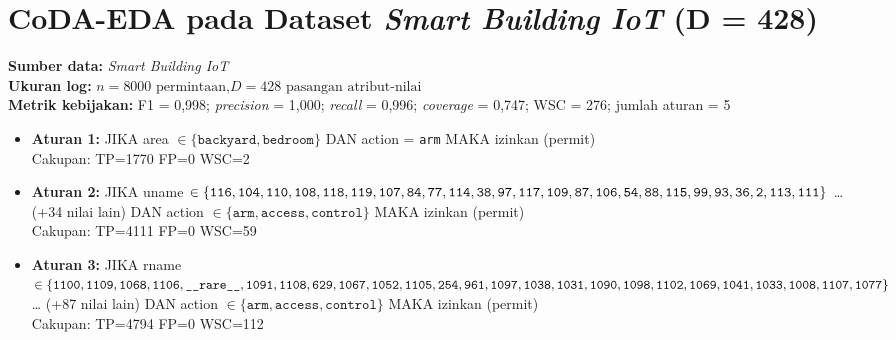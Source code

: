 \section{CoDA-EDA pada Dataset \textit{Smart Building IoT} (D = 428)}

\textbf{Sumber data:} \textit{Smart Building IoT} \\
\textbf{Ukuran log:} $n = 8000 \text{ permintaan,} D = 428 \text{ pasangan atribut-nilai}$ \\
\textbf{Metrik kebijakan:} F1 = 0,998; \textit{precision} = 1,000; \textit{recall} = 0,996; \textit{coverage} = 0,747; WSC = 276; jumlah aturan = 5 \\

\begin{itemize}
    \item \textbf{Aturan 1:} JIKA \textsf{area} $\in \{\texttt{backyard}, \texttt{bedroom}\}$ DAN \textsf{action} = \texttt{arm} MAKA izinkan (permit) \\
    \hspace*{1cm} Cakupan: TP=1770  FP=0  WSC=2

    \item \textbf{Aturan 2:} JIKA \textsf{uname} $\in \{\texttt{116}, \texttt{104}, \texttt{110}, \texttt{108}, \texttt{118}, \texttt{119}, \texttt{107}, \texttt{84}, \texttt{77}, \\\texttt{114}, \texttt{38}, \texttt{97}, \texttt{117}, \texttt{109}, \texttt{87}, \texttt{106}, \texttt{54}, \texttt{88}, \texttt{115}, \texttt{99}, \texttt{93}, \texttt{36}, \texttt{2}, \texttt{113}, \texttt{111}\}$ … (+34 nilai lain) DAN \textsf{action} $\in \{\texttt{arm}, \texttt{access}, \texttt{control}\}$ MAKA izinkan (permit) \\
    \hspace*{1cm} Cakupan: TP=4111  FP=0  WSC=59

    \item \textbf{Aturan 3:} JIKA \textsf{rname} $\in \{\texttt{1100}, \texttt{1109}, \texttt{1068}, \texttt{1106}, \texttt{\_\_rare\_\_}, \texttt{1091}, \\\texttt{1108}, \texttt{629}, \texttt{1067}, \texttt{1052}, \texttt{1105}, \texttt{254}, \texttt{961}, \texttt{1097}, \texttt{1038}, \texttt{1031}, \texttt{1090}, \\\texttt{1098}, \texttt{1102}, \texttt{1069}, \texttt{1041}, \texttt{1033}, \texttt{1008}, \texttt{1107}, \texttt{1077}\}$ … (+87 nilai lain) DAN \textsf{action} $\in \{\texttt{arm}, \texttt{access}, \texttt{control}\}$ MAKA izinkan (permit) \\
    \hspace*{1cm} Cakupan: TP=4794  FP=0  WSC=112


\end{itemize}
